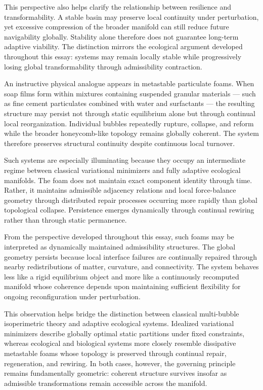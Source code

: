 \documentclass[11pt,a4paper]{article}
\begin{document}
This perspective also helps clarify the relationship between resilience and transformability. A stable basin may preserve local continuity under perturbation, yet excessive compression of the broader manifold can still reduce future navigability globally. Stability alone therefore does not guarantee long-term adaptive viability. The distinction mirrors the ecological argument developed throughout this essay: systems may remain locally stable while progressively losing global transformability through admissibility contraction.

An instructive physical analogue appears in metastable particulate foams. When soap films form within mixtures containing suspended granular materials --- such as fine cement particulates combined with water and surfactants --- the resulting structure may persist not through static equilibrium alone but through continual local reorganization. Individual bubbles repeatedly rupture, collapse, and reform while the broader honeycomb-like topology remains globally coherent. The system therefore preserves structural continuity despite continuous local turnover.

Such systems are especially illuminating because they occupy an intermediate regime between classical variational minimizers and fully adaptive ecological manifolds. The foam does not maintain exact component identity through time. Rather, it maintains admissible adjacency relations and local force-balance geometry through distributed repair processes occurring more rapidly than global topological collapse. Persistence emerges dynamically through continual rewiring rather than through static permanence.

From the perspective developed throughout this essay, such foams may be interpreted as dynamically maintained admissibility structures. The global geometry persists because local interface failures are continually repaired through nearby redistributions of matter, curvature, and connectivity. The system behaves less like a rigid equilibrium object and more like a continuously recomputed manifold whose coherence depends upon maintaining sufficient flexibility for ongoing reconfiguration under perturbation.

This observation helps bridge the distinction between classical multi-bubble isoperimetric theory and adaptive ecological systems. Idealized variational minimizers describe globally optimal static partitions under fixed constraints, whereas ecological and biological systems more closely resemble dissipative metastable foams whose topology is preserved through continual repair, regeneration, and rewiring. In both cases, however, the governing principle remains fundamentally geometric: coherent structure survives insofar as admissible transformations remain accessible across the manifold.
\end{document}
